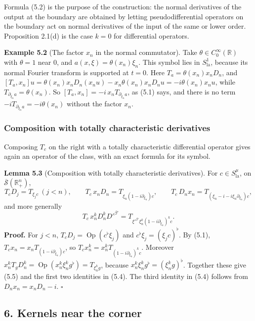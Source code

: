 \documentclass[
  11pt,
]{article}
\begin{document}
Formula (5.2) is the purpose of the construction: the normal derivatives
of the output at the boundary are obtained by letting pseudodifferential
operators on the boundary act on normal derivatives of the input of the
same or lower order. Proposition 2.1(d) is the case \(k=0\) for
differential operators.

\textbf{Example 5.2} (The factor \(x_n\) in the normal commutator). Take
\(\theta\in C_0^\infty(\mathbb R)\) with \(\theta=1\) near 0, and
\(a(x,\xi)=\theta(x_n)\xi_n\). This symbol lies in
\(S^1_{\mathrm{la}}\), because its normal Fourier transform is supported
at \(t=0\). Here \(T_a=\theta(x_n)x_nD_n\), and
\([T_a,x_n]u=\theta(x_n)x_nD_n(x_nu)-x_n\theta(x_n)x_nD_nu=-i\theta(x_n)x_nu\),
while \(T_{\partial_{\xi_n}a}=\theta(x_n)\). So
\([T_a,x_n]=-i\,x_nT_{\partial_{\xi_n}a}\), as (5.1) says, and there is
no term \(-iT_{\partial_{\xi_n}a}=-i\theta(x_n)\) without the factor
\(x_n\).

\subsubsection{Composition with totally characteristic
derivatives}\label{composition-with-totally-characteristic-derivatives}

Composing \(T_c\) on the right with a totally characteristic
differential operator gives again an operator of the class, with an
exact formula for its symbol.

\textbf{Lemma 5.3} (Composition with totally characteristic
derivatives). For \(c\in S^\mu_{\mathrm{la}}\), on
\(\overline{\mathcal S}(\mathbb R^n_+)\), \[
T_cD_j=T_{\xi_jc}\ (j<n),\qquad T_c\,x_nD_n=T_{\xi_n(1-i\partial_{\xi_n})c},\qquad T_c\,D_nx_n=T_{(\xi_n-i-i\xi_n\partial_{\xi_n})c},
\tag{5.4}
\] and more generally \[
T_c\,x_n^kD_n^kD'^{\beta'}=T_{\xi'^{\beta'}\xi_n^k(1-i\partial_{\xi_n})^kc}.
\tag{5.5}
\] \textbf{Proof.} For \(j<n\),
\(T_cD_j=\operatorname{Op}(c^\flat\xi_j)\) and
\(c^\flat\xi_j=(\xi_jc)^\flat\). By (5.1),
\(T_cx_n=x_nT_{(1-i\partial_{\xi_n})c}\), so
\(T_cx_n^k=x_n^kT_{(1-i\partial_{\xi_n})^kc}\). Moreover
\(x_n^kT_gD_n^k=\operatorname{Op}(x_n^k\xi_n^kg^\flat)=T_{\xi_n^kg}\),
because \(x_n^k\xi_n^kg^\flat=(\xi_n^kg)^\flat\). Together these give
(5.5) and the first two identities in (5.4). The third identity in (5.4)
follows from \(D_nx_n=x_nD_n-i\). \(\square\)

\subsection{6. Kernels near the corner}\label{kernels-near-the-corner}
\end{document}
